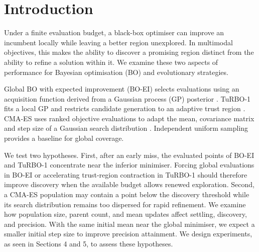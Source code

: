 \section{Introduction}\label{sec:intro}
Under a finite evaluation budget, a black-box optimiser can improve an incumbent locally while leaving a better region unexplored. In multimodal objectives, this makes the ability to discover a promising region distinct from the ability to refine a solution within it. We examine these two aspects of performance for Bayesian optimisation (BO) and evolutionary strategies.

Global BO with expected improvement (BO-EI) selects evaluations using an acquisition function derived from a Gaussian process (GP) posterior \cite{frazier}. TuRBO-1 fits a local GP and restricts candidate generation to an adaptive trust region \cite{eriksson}. CMA-ES uses ranked objective evaluations to adapt the mean, covariance matrix and step size of a Gaussian search distribution \cite{hansen}. Independent uniform sampling provides a baseline for global coverage.

We test two hypotheses. First, after an early miss, the evaluated points of BO-EI and TuRBO-1 concentrate near the inferior minimiser. Forcing global evaluations in BO-EI or accelerating trust-region contraction in TuRBO-1 should therefore improve discovery when the available budget allows renewed exploration. Second, a CMA-ES population may contain a point below the discovery threshold while its search distribution remains too dispersed for rapid refinement. We examine how population size, parent count, and mean updates affect
settling, discovery, and precision. With the same initial mean near
the global minimiser, we expect a smaller initial step size to
improve precision attainment.  We design experiments, as seen in Sections 4 and 5, to assess these hypotheses.
